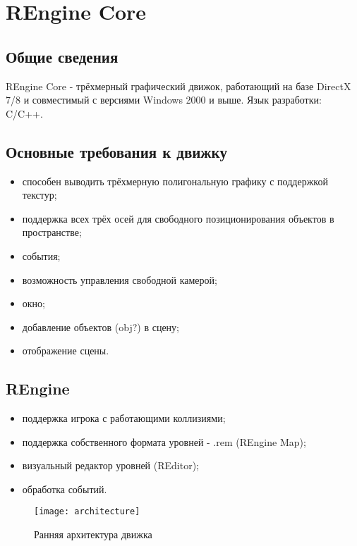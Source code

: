 \section{REngine Core}
\subsection{Общие сведения}

REngine Core - трёхмерный графический движок, работающий на базе DirectX 7/8 и совместимый с версиями Windows 2000 и выше. Язык разработки: C/C++.

\subsection{Основные требования к движку}

\begin{itemize}
	\item способен выводить трёхмерную полигональную графику с поддержкой текстур;
	\item поддержка всех трёх осей для свободного позиционирования объектов в пространстве;
	\item события;
	\item возможность управления свободной камерой;
	\item окно;
	\item добавление объектов (obj?) в сцену;
	\item отображение сцены.
\end{itemize}

\subsection{REngine}

\begin{itemize}
	\item поддержка игрока с работающими коллизиями;
	\item поддержка собственного формата уровней - .rem (REngine Map);
	\item визуальный редактор уровней (REditor);
	\item обработка событий.
\end{itemize}

\begin{figure}[ht]
	\texttt{[image: architecture]}
	\caption{Ранняя архитектура движка}
	\label{architecture:image}
\end{figure}